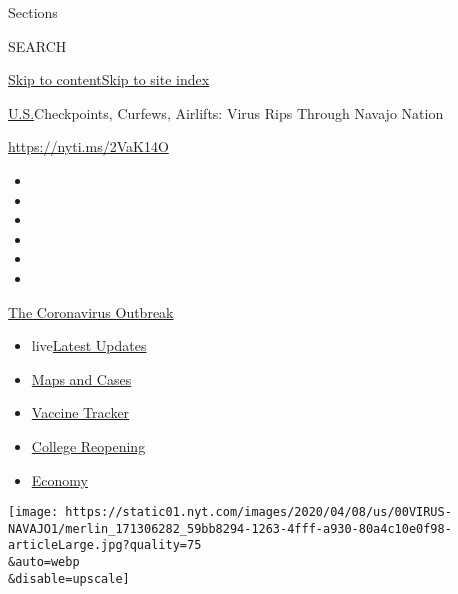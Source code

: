 Sections

SEARCH

\protect\hyperlink{site-content}{Skip to
content}\protect\hyperlink{site-index}{Skip to site index}

\href{/section/us}{U.S.}\textbar{}Checkpoints, Curfews, Airlifts: Virus
Rips Through Navajo Nation

\url{https://nyti.ms/2VaK14O}

\begin{itemize}
\item
\item
\item
\item
\item
\item
\end{itemize}

\href{https://www.nytimes.com/news-event/coronavirus?action=click\&pgtype=Article\&state=default\&region=TOP_BANNER\&context=storylines_menu}{The
Coronavirus Outbreak}

\begin{itemize}
\tightlist
\item
  live\href{https://www.nytimes.com/2020/08/04/world/coronavirus-cases.html?action=click\&pgtype=Article\&state=default\&region=TOP_BANNER\&context=storylines_menu}{Latest
  Updates}
\item
  \href{https://www.nytimes.com/interactive/2020/us/coronavirus-us-cases.html?action=click\&pgtype=Article\&state=default\&region=TOP_BANNER\&context=storylines_menu}{Maps
  and Cases}
\item
  \href{https://www.nytimes.com/interactive/2020/science/coronavirus-vaccine-tracker.html?action=click\&pgtype=Article\&state=default\&region=TOP_BANNER\&context=storylines_menu}{Vaccine
  Tracker}
\item
  \href{https://www.nytimes.com/2020/08/02/us/covid-college-reopening.html?action=click\&pgtype=Article\&state=default\&region=TOP_BANNER\&context=storylines_menu}{College
  Reopening}
\item
  \href{https://www.nytimes.com/live/2020/08/04/business/stock-market-today-coronavirus?action=click\&pgtype=Article\&state=default\&region=TOP_BANNER\&context=storylines_menu}{Economy}
\end{itemize}

\texttt{[image: https://static01.nyt.com/images/2020/04/08/us/00VIRUS-NAVAJO1/merlin\_171306282\_59bb8294-1263-4fff-a930-80a4c10e0f98-articleLarge.jpg?quality=75\\\&auto=webp\\\&disable=upscale]}

